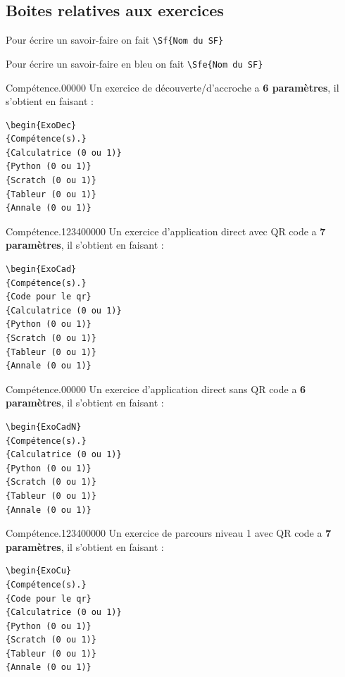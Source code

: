 \begin{pageAD}

\subsection{Boites relatives aux exercices}


Pour écrire un savoir-faire on fait \verb|\Sf{Nom du SF}|


Pour écrire un savoir-faire en bleu on fait \verb|\Sfe{Nom du SF}|

\begin{ExoDec}{Compétence.}{0}{0}{0}{0}{0}
Un exercice de découverte/d'accroche a \textbf{6 paramètres}, il s'obtient en faisant : 
\begin{verbatim}
\begin{ExoDec}
{Compétence(s).}
{Calculatrice (0 ou 1)}
{Python (0 ou 1)}
{Scratch (0 ou 1)}
{Tableur (0 ou 1)}
{Annale (0 ou 1)}
\end{verbatim}
\end{ExoDec}

\begin{ExoCad}{Compétence.}{1234}{0}{0}{0}{0}{0}
Un exercice d'application direct avec QR code a \textbf{7 paramètres}, il s'obtient en faisant : 
\begin{verbatim}
\begin{ExoCad}
{Compétence(s).}
{Code pour le qr}
{Calculatrice (0 ou 1)}
{Python (0 ou 1)}
{Scratch (0 ou 1)}
{Tableur (0 ou 1)}
{Annale (0 ou 1)}
\end{verbatim}
\end{ExoCad}

\begin{ExoCadN}{Compétence.}{0}{0}{0}{0}{0}
Un exercice d'application direct sans QR code a \textbf{6 paramètres}, il s'obtient en faisant : 
\begin{verbatim}
\begin{ExoCadN}
{Compétence(s).}
{Calculatrice (0 ou 1)}
{Python (0 ou 1)}
{Scratch (0 ou 1)}
{Tableur (0 ou 1)}
{Annale (0 ou 1)}
\end{verbatim}
\end{ExoCadN}

\begin{ExoCu}{Compétence.}{1234}{0}{0}{0}{0}{0}
Un exercice de parcours niveau 1 avec QR code a \textbf{7 paramètres}, il s'obtient en faisant : 
\begin{verbatim}
\begin{ExoCu}
{Compétence(s).}
{Code pour le qr}
{Calculatrice (0 ou 1)}
{Python (0 ou 1)}
{Scratch (0 ou 1)}
{Tableur (0 ou 1)}
{Annale (0 ou 1)}
\end{verbatim}
\end{ExoCu}


\end{pageAD}
